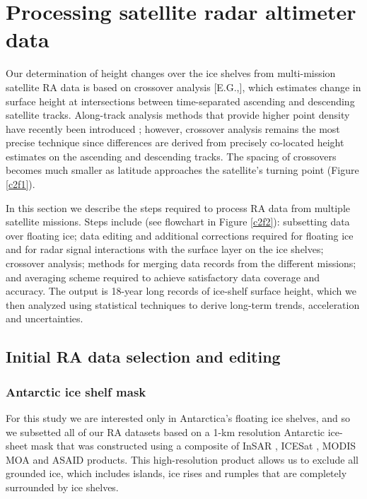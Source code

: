 \section{Processing satellite radar altimeter data}

Our determination of height changes over the ice shelves from multi-mission satellite RA data is based on crossover analysis [E.G.,]\parencite[e.g.,][]{Davis2004, Wingham2009, Zwally2005}, which estimates change in surface height at intersections between time-separated ascending and descending satellite tracks. Along-track analysis methods that provide higher point density have recently been introduced \parencite{Flament2012, Moholdt2010, Pritchard2012}; however, crossover analysis remains the most precise technique since differences are derived from precisely co-located height estimates on the ascending and descending tracks. The spacing of crossovers becomes much smaller as latitude approaches the satellite's turning point (Figure \ref{c2f1}).

In this section we describe the steps required to process RA data from multiple satellite missions. Steps include (see flowchart in Figure \ref{c2f2}): subsetting data over floating ice; data editing and additional corrections required for floating ice and for radar signal interactions with the surface layer on the ice shelves; crossover analysis; methods for merging data records from the different missions; and averaging scheme required to achieve satisfactory data coverage and accuracy. The output is 18-year long records of ice-shelf surface height, which we then analyzed using statistical techniques to derive long-term trends, acceleration and uncertainties.

\subsection{Initial RA data selection and editing}
\label{ra-processing}

\subsubsection{Antarctic ice shelf mask}

For this study we are interested only in Antarctica's floating ice shelves, and so we subsetted all of our RA datasets based on a 1-km resolution Antarctic ice-sheet mask \parencite{Depoorter2013} that was constructed using a composite of InSAR \parencite{Rignot2011}, ICESat \parencite{Brunt2010, Fricker2009}, MODIS MOA \parencite{Scambos2007} and ASAID \parencite{Bindschadler2011} products. This high-resolution product allows us to exclude all grounded ice, which includes islands, ice rises and rumples that are completely surrounded by ice shelves.

